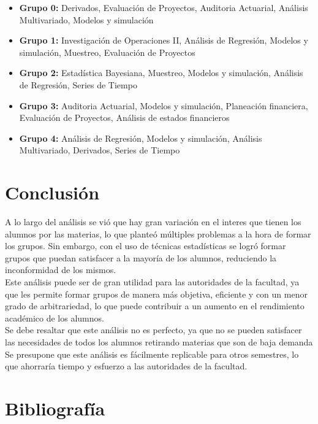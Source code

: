 \documentclass[12pt]{article}
\begin{document}
\begin{itemize}
    \item \textbf{Grupo 0:} Derivados, Evaluación de Proyectos, Auditoria Actuarial, Análisis Multivariado, Modelos y simulación
    \item \textbf{Grupo 1:} Investigación de Operaciones II, Análisis de Regresión, Modelos y simulación, Muestreo, Evaluación de Proyectos
    \item \textbf{Grupo 2:} Estadística Bayesiana, Muestreo, Modelos y simulación, Análisis de Regresión, Series de Tiempo
    \item \textbf{Grupo 3:} Auditoria Actuarial, Modelos y simulación, Planeación financiera, Evaluación de Proyectos, Análisis de estados financieros
    \item \textbf{Grupo 4:} Análisis de Regresión, Modelos y simulación, Análisis Multivariado, Derivados, Series de Tiempo
\end{itemize}

\section{Conclusión}

A lo largo del análisis se vió que hay gran variación en el interes que tienen los alumnos por las materias, lo que planteó múltiples
problemas a la hora de formar los grupos. Sin embargo, con el uso de técnicas estadísticas se logró formar grupos que puedan satisfacer
a la mayoría de los alumnos, reduciendo la inconformidad de los mismos.\\
Este análisis puede ser de gran utilidad para las autoridades de la facultad, ya que les permite formar grupos de manera más objetiva,
eficiente y con un menor grado de arbitrariedad, lo que puede contribuir a un aumento en el rendimiento académico de los alumnos.\\
Se debe resaltar que este análisis no es perfecto, ya que no se pueden satisfacer las necesidades de todos los alumnos retirando materias
que son de baja demanda\\
Se presupone que este análisis es fácilmente replicable para otros semestres, lo que ahorraría tiempo y esfuerzo a las autoridades de la
facultad.

\section{Bibliografía}

\end{document}
